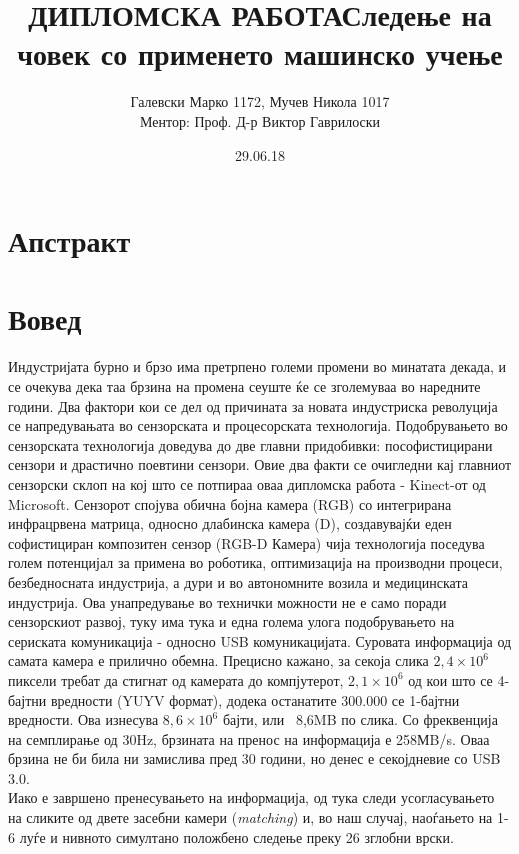 \documentclass[12pt]{article}
\title{ДИПЛОМСКА РАБОТА\bigbreak \textbf{Следење на човек со применето машинско учење}}
\date{29.06.18}
\author{Галевски Марко 1172, Мучев Никола 1017	\\	Ментор: Проф. Д-р Виктор Гаврилоски}
\begin{document}
    \sloppy
    \maketitle{}
    \newpage
    \tableofcontents
    \newpage

\section*{Апстракт}

\section{Вовед}
  Индустријата бурно и брзо има претрпено големи промени во минатата декада, и се очекува дека таа брзина на промена сеуште ќе се зголемуваа во наредните години. Два фактори кои се дел од причината за новата индустриска револуција се напредувањата во сензорската и процесорската технологија.\bigbreak
  Подобрувањето во сензорската технологија доведува до две главни придобивки: пософистицирани сензори и драстично поевтини сензори. Овие два факти се очигледни кај главниот сензорски склоп на кој што се потпираа оваа дипломска работа - Kinect-от од Microsoft. Сензорот спојува обична бојна камера (RGB) со интегрирана инфрацрвена матрица, односно длабинска камера (D), создавувајќи еден софистициран композитен сензор (RGB-D Камера) чија технологија поседува голем потенцијал за примена во роботика, оптимизација на производни процеси, безбедносната индустрија, а дури и во автономните возила и медицинската индустрија.
  \bigbreak
  Ова унапредување во технички можности не е само поради сензорскиот развој, туку има тука и една голема улога подобрувањето на сериската комуникација - односно USB комуникацијата.
  Суровата информација од самата камера е прилично обемна. Прецисно кажано, за секоја слика $2,4 \times 10^6$ пиксели требат да стигнат од камерата до компјутерот, $2,1 \times 10^6$ од кои што се 4-бајтни вредности (YUYV формат), додека останатите 300.000 се 1-бајтни вредности. Ова изнесува $8,6 \times 10^6$ бајти, или ~8,6MB по слика. Со фреквенција на семплирање од 30Hz, брзината на пренос на информација е 258МB/s. Оваа брзина не би била ни замислива пред 30 години, но денес е секојдневие со USB 3.0.
  \\
  Иако е завршено пренесувањето на информација, од тука следи усогласувањето на сликите од двете засебни камери (\textit{matching}) и, во наш случај, наоѓањето на 1-6 луѓе и нивното симултано положбено следење преку 26 зглобни врски.
\end{document}
